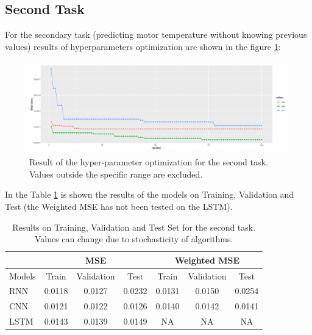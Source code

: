 \subsection{Second Task}
For the secondary task (predicting motor temperature without knowing previous values) results of hyperparameters optimization are shown in the figure \ref{fig:second_task}:
\begin{figure}[!h]
    \centering
    \includegraphics[width=\linewidth, height=4cm]{imgs/comparison_MSE_second.png}
    \caption{Result of the hyper-parameter optimization for the second task. Values outside the specific range are excluded.}
    \label{fig:second_task}
\end{figure}

In the Table \ref{tab:second} is shown the results of the models on Training, Validation and Test (the Weighted MSE has not been tested on the LSTM).
\begin{table}[!h]
  \centering
  \begin{tabular}{|l|c|c|c|c|c|c|}
    \hline
    & \multicolumn{3}{|c|}{MSE} & \multicolumn{3}{|c|}{Weighted MSE} \\
    \hline
    Models & Train & Validation & Test   & Train  & Validation & Test \\
    \hline
    RNN   & 0.0118 & 0.0127     & 0.0232 & 0.0131 & 0.0150     &  0.0254\\
    CNN   & 0.0121 & 0.0122     & 0.0126 & 0.0140 & 0.0142     & 0.0141\\
    LSTM  & 0.0143 & 0.0139     & 0.0149 & NA     & NA         & NA\\
    \hline
  \end{tabular}
  \caption{Results on Training, Validation and Test Set for the second task. Values can change due to stochasticity of algorithms.}
  \label{tab:second}
\end{table}


